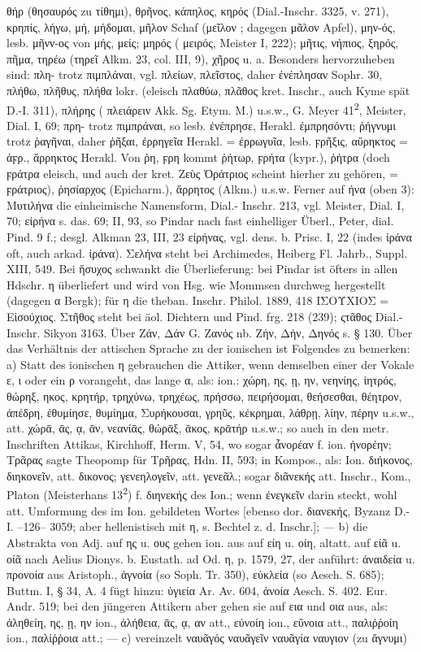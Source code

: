 θήρ (θησαυρός zu τίθημι), θρῆνος, κάπηλος, κηρός (Dial.-Inschr. 3325, v. 271), κρηπίς, λήγω, μή, μήδομαι, μῆλον Schaf (μεῖλον ; dagegen μᾶλον Apfel), μην-ός, lesb. μῆνν-ος von μής, μείς; μηρός ( μειρός, Meister I, 222); μῆτις, νήπιος, ξηρός, πῆμα, τηρέω (τηρεῖ Alkm. 23, col. III, 9), χῆρος u. a. Besonders hervorzuheben sind: πλη- trotz πιμπλάναι, vgl. πλείων, πλεῖστος, daher ἐνέπλησαν Sophr. 30, πλήθω, πλῆθυς, πλήθα lokr. (eleisch πλαθύω, πλᾶθος kret. Inschr., auch Kyme spät D.-I. 311), πλήρης ( πλειάρειν Akk. Sg. Etym. M.) u.s.w., G. Meyer 41\textsuperscript{2}, Meister, Dial. I, 69; πρη- trotz πιμπράναι, so lesb. ἐνέπρησε, Herakl. ἐμπρησόντι; ῥήγνυμι trotz ῥαγῆναι, daher ῥῆξαι, ἐρρηγεῖα Herakl. = ἐρρωγυῖα, lesb. ϝρῆξις, αὔρηκτος = ἀϝρ., ἄρρηκτος Herakl. Von ῥη, ϝρη kommt ῥήτωρ, ϝρήτα (kypr.), ῥήτρα (doch ϝράτρα eleisch, und auch der kret. Ζεὺς Ὀράτριος scheint hierher zu gehören, = ϝράτριος), ῥησίαρχος (Epicharm.), ἄρρητος (Alkm.) u.s.w. Ferner auf ήνα (oben 3): Μυτιλήνα die einheimische Namensform, Dial.- Inschr. 213, vgl. Meister, Dial. I, 70; εἰρήνα s. das. 69; II, 93, so Pindar nach fast einhelliger Überl., Peter, dial. Pind. 9 f.; desgl. Alkman 23, III, 23 εἰρήνας, vgl. dens. b. Prisc. I, 22 (indes ἰράνα  oft, auch arkad. ἰράνα). Σελήνα steht bei Archimedes, Heiberg Fl. Jahrb., Suppl. XIII, 549. Bei ἥσυχος schwankt die Überlieferung: bei Pindar ist öfters in allen Hdschr. η überliefert und wird von Hsg. wie Mommsen durchweg hergestellt (dagegen α Bergk); für η die theban. Inschr. Philol. 1889, 418 ΙΣΟΥΧΙΟΣ = Εἱσούχιος. Στῆθος steht bei äol. Dichtern und Pind. frg. 218 (239); ςτᾶθος Dial.-Inschr. Sikyon 3163. Über Ζάν, Δάν G. Ζανός nb. Ζήν, Δήν, Δηνός s. § 130. Über das Verhältnis der attischen Sprache zu der ionischen ist Folgendes zu bemerken: a) Statt des ionischen η gebrauchen die Attiker, wenn demselben einer der Vokale ε, ι oder ein ρ vorangeht, das lange α, als: ion.: χώρη, ης, ῃ, ην, νεηνίης, ἰητρός, θώρηξ, ηκος, κρητήρ, τρηχύνω, τρηχέως, πρήσσω, πειρήσομαι, θεήσεσθαι, θέητρον, ἀπέδρη, ἐθυμίησε, θυμίημα, Συρήκουσαι, γρηῦς, κέκρημαι, λάθρῃ, λίην, πέρην u.s.w., att. χώρᾱ, ᾱς, ᾳ, ᾱν, νεανίᾱς, θώρᾱξ, ᾱκος, κρᾱτήρ u.s.w.; so auch in den metr. Inschriften Attikas, Kirchhoff, Herm. V, 54, wo sogar ἆνορέαν f. ion. ἠνορέην; Τρᾶρας sagte Theopomp für Τρῆρας, Hdn. II, 593; in Kompos., als: Ion. διήκονος, διηκονεῖν, att. δικονος; γενεηλογεῖν, att. γενεᾶλ.; sogar διᾶνεκής att. Inschr., Kom., Platon (Meisterhans 13\textsuperscript{2}) f. διηνεκής des Ion.; wenn ἐνεγκεῖν darin steckt, wohl att. Umformung des im Ion. gebildeten Wortes [ebenso dor. διανεκής, Byzanz D.-I. --126-- 3059; aber hellenistisch mit η, s. Bechtel z. d. Inschr.]; — b) die Abstrakta von Adj. auf ης u. ους gehen ion. aus auf είη u. οίη, altatt. auf είᾶ u. οίᾶ nach Aelius Dionys. b. Eustath. ad Od. η, p. 1579, 27, der anführt: ἀναιδεία u. προνοία aus Aristoph., ἀγνοία (so Soph. Tr. 350), εὐκλεία (so Aesch. S. 685); Buttm. I, § 34, A. 4 fügt hinzu: ὑγιεία Ar. Av. 604, ἀνοία Aesch. S. 402. Eur. Andr. 519; bei den jüngeren Attikern aber gehen sie auf εια und οια aus, als: ἀληθείη, ης, ῃ, ην ion., ἀλήθεια, ᾱς, ᾳ, αν att., εὐνοίη ion., εὔνοια att., παλιῤῥοίη ion., παλίῤῥοια att.; — c) vereinzelt ναυᾶγός ναυᾶγεῖν ναυᾶγία ναυγιον (zu ἄγνυμι) 
